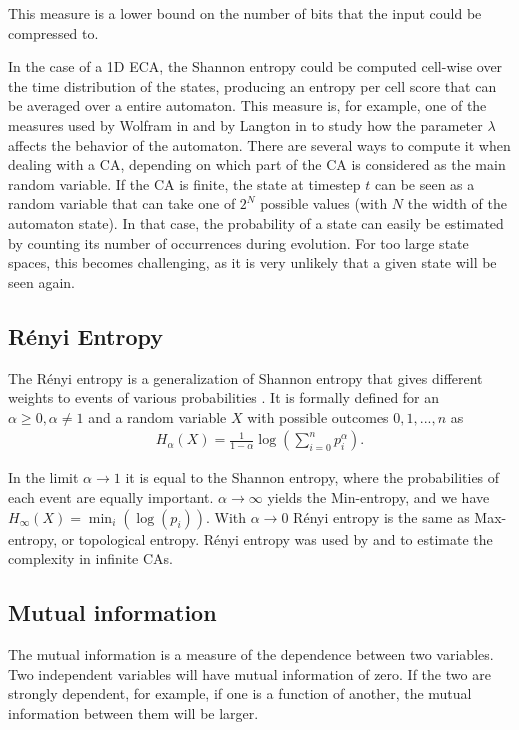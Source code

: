 This measure is a lower bound on the number of bits that the input could be
compressed to.

In the case of a 1D \ac{ECA}, the Shannon entropy could be computed cell-wise
over the time distribution of the states, producing an entropy per cell score
that can be averaged over a entire automaton. This measure is, for example, one
of the measures used by Wolfram in
\parencite{wolframStatisticalMechanicsCellular1983} and by Langton in
\parencite{langtonComputationEdgeChaos1990} to study how the parameter $\lambda$
affects the behavior of the automaton. There are several ways to compute it when
dealing with a CA, depending on which part of the CA is considered as the main
random variable. If the CA is finite, the state at timestep $t$ can be seen as a
random variable that can take one of $2^N$ possible values (with $N$ the width
of the automaton state). In that case, the probability of a state can easily be
estimated by counting its number of occurrences during evolution. For too large
state spaces, this becomes challenging, as it is very unlikely that a given state will
be seen again.

\subsection{Rényi Entropy}
The Rényi entropy is a generalization of Shannon entropy that gives different
weights to events of various probabilities
\parencite{renyiMeasuresEntropyInformation1961}. It is formally defined for an
$\alpha \geq 0, \alpha \neq 1$ and a random variable $X$ with possible outcomes $0, 1, ..., n$ as
\begin{align*}
  H_\alpha(X) = \frac{1}{1-\alpha} \log\left(\sum_{i=0}^np_i^\alpha\right).
\end{align*}

In the limit $\alpha \rightarrow 1$ it is equal to the Shannon entropy, where the probabilities of each event are equally important. $\alpha \rightarrow \infty$ yields the Min-entropy, and we have
$H_{\infty} (X) = \min_{i}(\log(p_{i}))$. With $\alpha \rightarrow 0$ Rényi entropy is the same as
Max-entropy, or topological entropy. Rényi entropy was used by
\textcite{wolframStatisticalMechanicsCellular1983} and
\textcite{lindgrenComplexityMeasuresCellular1988} to estimate the complexity in
infinite \acp{CA}.

\subsection{Mutual information}
The mutual information is a measure of the dependence between two variables. Two
independent variables will have mutual information of zero. If the two are
strongly dependent, for example, if one is a function of another, the mutual
information between them will be larger.

